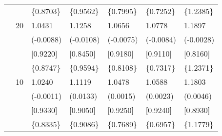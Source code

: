 \begin{table}[ht]
\begin{tabular}{lllllll}
&&\{0.8703\}&\{0.9562\}&\{0.7995\}&\{0.7252\}&\{1.2385\}\\
&20&1.0431&1.1258&1.0656&1.0778&1.1897\\
&&(-0.0088)&(-0.0108)&(-0.0075)&(-0.0084)&(-0.0028)\\
&&[0.9220]&[0.8450]&[0.9180]&[0.9110]&[0.8160]\\
&&\{0.8747\}&\{0.9594\}&\{0.8108\}&\{0.7317\}&\{1.2371\}\\
&10&1.0240&1.1119&1.0478&1.0588&1.1803\\
&&(-0.0011)&(0.0133)&(0.0015)&(0.0023)&(0.0046)\\
&&[0.9330]&[0.9050]&[0.9250]&[0.9240]&[0.8930]\\
&&\{0.8335\}&\{0.9086\}&\{0.7689\}&\{0.6957\}&\{1.1779\}\\
\hline
\end{tabular}
\end{table}


